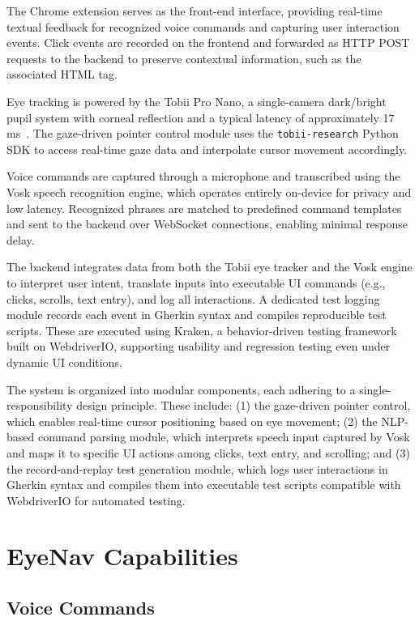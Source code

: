 The Chrome extension serves as the front-end interface, providing real-time textual feedback for recognized voice commands and capturing user interaction events. Click events are recorded on the frontend and forwarded as HTTP POST requests to the backend to preserve contextual information, such as the associated HTML tag. 

Eye tracking is powered by the Tobii Pro Nano, a single-camera dark/bright pupil system with corneal reflection and a typical latency of approximately 17 ms~\cite{tobiiabndpronano}. The gaze-driven pointer control module uses the \verb|tobii-research| Python SDK to access real-time gaze data and interpolate cursor movement accordingly.

Voice commands are captured through a microphone and transcribed using the Vosk speech recognition engine\misref, which operates entirely on-device for privacy and low latency. Recognized phrases are matched to predefined command templates and sent to the backend over WebSocket connections, enabling minimal response delay.

The backend integrates data from both the Tobii eye tracker and the Vosk engine to interpret user intent, translate inputs into executable UI commands (e.g., clicks, scrolls, text entry), and log all interactions. A dedicated test logging module records each event in Gherkin syntax and compiles reproducible test scripts. These are executed using Kraken, a behavior-driven testing framework built on WebdriverIO\misref, supporting usability and regression testing even under dynamic UI conditions.

The system is organized into modular components, each adhering to a single-responsibility design principle. These include: (1) the gaze-driven pointer control, which enables real-time cursor positioning based on eye movement; (2) the NLP-based command parsing module, which interprets speech input captured by Vosk and maps it to specific UI actions among clicks, text entry, and scrolling; and (3) the record-and-replay test generation module, which logs user interactions in Gherkin syntax and compiles them into executable test scripts compatible with WebdriverIO for automated testing.

\section{EyeNav Capabilities}

\subsection{Voice Commands}

